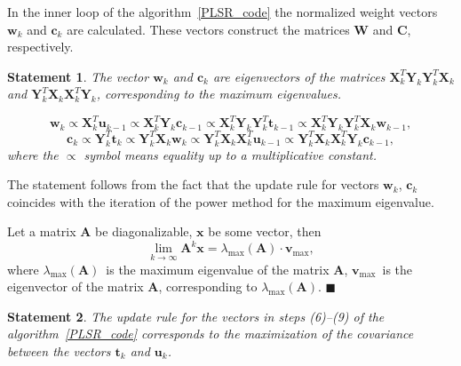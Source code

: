 \documentclass[12pt,twoside]{article}
\newtheorem{statement}{Statement}
\begin{document}
In the inner loop of the algorithm~\ref{PLSR_code} the normalized weight vectors $\mathbf{w}_k$ and $\mathbf{c}_k$ are calculated. 
These vectors construct the matrices $\mathbf{W}$ and $\mathbf{C}$, respectively.

\begin{statement}
	The vector $\mathbf{w}_k$ and $\mathbf{c}_k$ are eigenvectors of the matrices $\mathbf{X}_k^{T} \mathbf{Y}_k \mathbf{Y}_k^{T} \mathbf{X}_k$ and $\mathbf{Y}_k^{T} \mathbf{X}_k \mathbf{X}_k^{T} \mathbf{Y}_k$, corresponding to the maximum eigenvalues.
	
	\begin{equation*}
	\mathbf{w}_k \varpropto \mathbf{X}_k^{T} \mathbf{u}_{k-1} \varpropto \mathbf{X}_k^{T} \mathbf{Y}_k \mathbf{c}_{k-1} \varpropto \mathbf{X}_k^{T} \mathbf{Y}_k \mathbf{Y}_k^{T} \mathbf{t}_{k-1} \varpropto \mathbf{X}_k^{T} \mathbf{Y}_k \mathbf{Y}_k^{T} \mathbf{X}_k \mathbf{w}_{k-1},
	\end{equation*}
	\begin{equation*}
	\mathbf{c}_k \varpropto \mathbf{Y}_k^{T} \mathbf{t}_k \varpropto \mathbf{Y}_k^{T} \mathbf{X}_k \mathbf{w}_k \varpropto \mathbf{Y}_k^{T} \mathbf{X}_k \mathbf{X}_k^{T} \mathbf{u}_{k-1} \varpropto \mathbf{Y}_k^{T} \mathbf{X}_k \mathbf{X}_k^{T} \mathbf{Y}_k \mathbf{c}_{k-1},
	\end{equation*}
	where the $\varpropto$ symbol means equality up to a multiplicative constant.
	\label{st::eig}
\end{statement}

The statement follows from the fact that the update rule for vectors $\mathbf{w}_k$, $\mathbf{c}_k$ coincides with the iteration of the power method for the maximum eigenvalue.

Let a matrix $\mathbf{A}$ be diagonalizable, $\mathbf{x}$ be some vector, then
\[
	\lim_{k \rightarrow \infty} \mathbf{A}^k \mathbf{x} = \lambda_{\max}(\mathbf{A}) \cdot \mathbf{v}_{\max},
\]
where $ \lambda_{\max} (\mathbf{A})$~is the maximum eigenvalue of the matrix $\mathbf{A}$, $\mathbf{v}_{\max}$~is the eigenvector of the matrix $\mathbf{A}$, corresponding to $ \lambda_{\max} (\mathbf{A})$.
$\blacksquare$

\begin{statement}

The update rule for the vectors in steps (6)--(9) of the algorithm~\ref{PLSR_code} corresponds to the maximization of the covariance between the vectors $\mathbf{t}_k$ and $\mathbf{u}_k$.
\end{statement}
\end{document}
